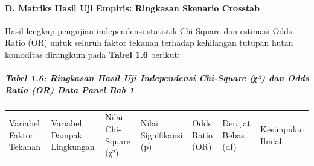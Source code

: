 \documentclass[
]{article}
\newcounter{none} %
\begin{document}
\paragraph{D. Matriks Hasil Uji Empiris: Ringkasan Skenario
Crosstab}\label{d.-matriks-hasil-uji-empiris-ringkasan-skenario-crosstab}

Hasil lengkap pengujian independensi statistik Chi-Square dan estimasi
Odds Ratio (OR) untuk seluruh faktor tekanan terhadap kehilangan tutupan
hutan komoditas dirangkum pada \textbf{Tabel 1.6} berikut:

\subparagraph{Tabel 1.6: Ringkasan Hasil Uji Independensi Chi-Square
(χ²) dan Odds Ratio (OR) Data Panel Bab
1}\label{tabel-1.6-ringkasan-hasil-uji-independensi-chi-square-ux3c7uxb2-dan-odds-ratio-or-data-panel-bab-1}

{\def\LTcaptype{none} %
\begin{longtable}[]{@{}
  >{\raggedright\arraybackslash}p{}
  >{\raggedright\arraybackslash}p{}
  >{\centering\arraybackslash}p{}
  >{\centering\arraybackslash}p{}
  >{\centering\arraybackslash}p{}
  >{\centering\arraybackslash}p{}
  >{\raggedright\arraybackslash}p{}@{}}
\toprule\noalign{}
\begin{minipage}[b]{\linewidth}\raggedright
Variabel Faktor Tekanan
\end{minipage} & \begin{minipage}[b]{\linewidth}\raggedright
Variabel Dampak Lingkungan
\end{minipage} & \begin{minipage}[b]{\linewidth}\centering
Nilai Chi-Square (χ²)
\end{minipage} & \begin{minipage}[b]{\linewidth}\centering
Nilai Signifikansi (p)
\end{minipage} & \begin{minipage}[b]{\linewidth}\centering
Odds Ratio (OR)
\end{minipage} & \begin{minipage}[b]{\linewidth}\centering
Derajat Bebas (df)
\end{minipage} & \begin{minipage}[b]{\linewidth}\raggedright
Kesimpulan Ilmiah
\end{minipage} \\

\end{longtable}}
\end{document}
